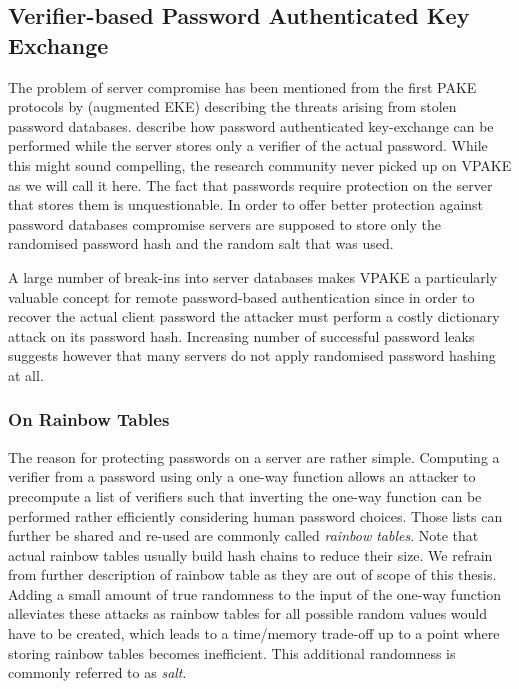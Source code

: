 \subsection{Verifier-based Password Authenticated Key Exchange}\label{sec:intro:verifier-basedPAKE}
The problem of server compromise has been mentioned from the first PAKE protocols by \citet{BellovinM93} (augmented EKE) describing the threats arising from stolen password databases.
\citet{BellovinM93} describe how password authenticated key-exchange can be performed while the server stores only a verifier of the actual password.
While this might sound compelling, the research community never picked up on \ac{VPAKE} as we will call it here.
The fact that passwords require protection on the server that stores them is unquestionable.
In order to offer better protection against password databases compromise servers are supposed to store only the randomised password hash and the random salt that was used.

A large number of break-ins into server databases makes \ac{VPAKE} a particularly valuable concept for remote password-based authentication since in order to recover the actual client password the attacker must perform a costly dictionary attack on its password hash.
Increasing number of successful password leaks~\cite{rockyouBreach,cupidBreach,adobeBreach} suggests however that many servers do not apply randomised password hashing at all. 

\subsubsection{On Rainbow Tables}
The reason for protecting passwords on a server are rather simple.
Computing a verifier from a password using only a one-way function allows an attacker to precompute a list of verifiers such that inverting the one-way function can be performed rather efficiently considering human password choices.
Those lists can further be shared and re-used are commonly called \emph{rainbow tables}.
Note that actual rainbow tables usually build hash chains to reduce their size.
We refrain from further description of rainbow table as they are out of scope of this thesis.
Adding a small amount of true randomness to the input of the one-way function alleviates these attacks as rainbow tables for all possible random values would have to be created, which leads to a time/memory trade-off up to a point where storing rainbow tables becomes inefficient.
This additional randomness is commonly referred to as \emph{salt}.

